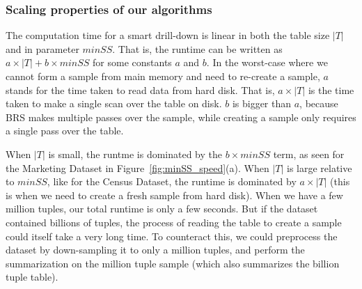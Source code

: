 \documentclass[10pt,journal,compsoc]{IEEEtran}
\begin{document}
\subsubsection{Scaling properties of our algorithms}
The computation time for a smart drill-down is linear in both the table size $|T|$ and in parameter $minSS$. That is, the runtime can be written as $a \times |T| + b \times minSS$ for some constants $a$ and $b$. In the worst-case where we cannot form a sample from main memory and need to re-create a sample, $a$ stands for the time taken to read data from hard disk. That is, $a \times |T|$ is the time taken to make a single scan over the table on disk. $b$ is bigger than $a$, because BRS makes multiple passes over the sample, while creating a sample only requires a single pass over the table.

When $|T|$ is small, the runtme is dominated by the $b \times minSS$ term, as seen for the Marketing Dataset in Figure~\ref{fig:minSS_speed}(a). When $|T|$ is large relative to $minSS$, like for the Census Dataset, the runtime is dominated by $a \times |T|$ (this is when we need to create a fresh sample from hard disk). When we have a few million tuples, our total runtime is only a few seconds. But if the dataset contained billions of tuples, the process of reading the table to create a sample could itself take a very long time. To counteract this, we could preprocess the dataset by down-sampling it to only a million tuples, and perform the summarization on the million tuple sample (which also summarizes the billion tuple table).
\end{document}
